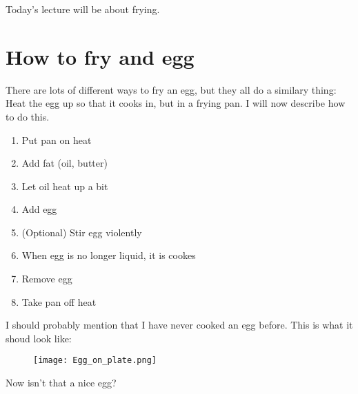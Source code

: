
\startEntry{}
Today's lecture will be about frying.
\section{How to fry and egg}
There are lots of different ways to fry an egg, but they all do a similary thing: Heat the egg up so that it cooks in, but in a frying pan. I will now describe how to do this.
\begin{enumerate}
\item Put pan on heat
\item Add fat (oil, butter)
\item Let oil heat up a bit
\item Add egg
\item (Optional) Stir egg violently
\item When egg is no longer liquid, it is cookes
\item Remove egg
\item Take pan off heat
\end{enumerate}
I should probably mention that I have never cooked an egg before.
This is what it shoud look like:
\begin{figure}[h]
\texttt{[image: Egg\_on\_plate.png]}
\end{figure}


Now isn't that a nice egg?
\finishEntry{}